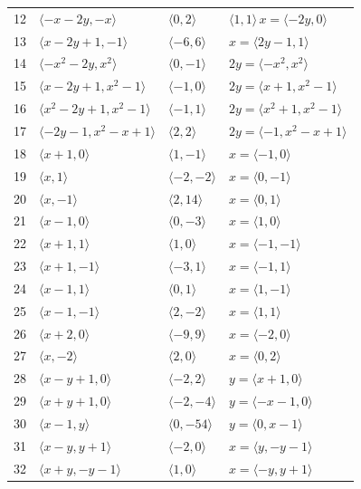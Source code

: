\documentclass[11pt]{article}
\begin{document}
\begin{longtable}{@{}rlll@{}}
12 & $\langle -x-2y,-x\rangle$ & $\langle 0,2\rangle$ & $\langle 1,1\rangle\,x=\langle -2y,0\rangle$\\
13 & $\langle x-2y+1,-1\rangle$ & $\langle -6,6\rangle$ & $x=\langle 2y-1,1\rangle$\\
14 & $\langle -x^{2}-2y,x^{2}\rangle$ & $\langle 0,-1\rangle$ & $2y=\langle -x^{2},x^{2}\rangle$\\
15 & $\langle x-2y+1,x^{2}-1\rangle$ & $\langle -1,0\rangle$ & $2y=\langle x+1,x^{2}-1\rangle$\\
16 & $\langle x^{2}-2y+1,x^{2}-1\rangle$ & $\langle -1,1\rangle$ & $2y=\langle x^{2}+1,x^{2}-1\rangle$\\
17 & $\langle -2y-1,x^{2}-x+1\rangle$ & $\langle 2,2\rangle$ & $2y=\langle -1,x^{2}-x+1\rangle$\\
18 & $\langle x+1,0\rangle$ & $\langle 1,-1\rangle$ & $x=\langle -1,0\rangle$\\
19 & $\langle x,1\rangle$ & $\langle -2,-2\rangle$ & $x=\langle 0,-1\rangle$\\
20 & $\langle x,-1\rangle$ & $\langle 2,14\rangle$ & $x=\langle 0,1\rangle$\\
21 & $\langle x-1,0\rangle$ & $\langle 0,-3\rangle$ & $x=\langle 1,0\rangle$\\
22 & $\langle x+1,1\rangle$ & $\langle 1,0\rangle$ & $x=\langle -1,-1\rangle$\\
23 & $\langle x+1,-1\rangle$ & $\langle -3,1\rangle$ & $x=\langle -1,1\rangle$\\
24 & $\langle x-1,1\rangle$ & $\langle 0,1\rangle$ & $x=\langle 1,-1\rangle$\\
25 & $\langle x-1,-1\rangle$ & $\langle 2,-2\rangle$ & $x=\langle 1,1\rangle$\\
26 & $\langle x+2,0\rangle$ & $\langle -9,9\rangle$ & $x=\langle -2,0\rangle$\\
27 & $\langle x,-2\rangle$ & $\langle 2,0\rangle$ & $x=\langle 0,2\rangle$\\
28 & $\langle x-y+1,0\rangle$ & $\langle -2,2\rangle$ & $y=\langle x+1,0\rangle$\\
29 & $\langle x+y+1,0\rangle$ & $\langle -2,-4\rangle$ & $y=\langle -x-1,0\rangle$\\
30 & $\langle x-1,y\rangle$ & $\langle 0,-54\rangle$ & $y=\langle 0,x-1\rangle$\\
31 & $\langle x-y,y+1\rangle$ & $\langle -2,0\rangle$ & $x=\langle y,-y-1\rangle$\\
32 & $\langle x+y,-y-1\rangle$ & $\langle 1,0\rangle$ & $x=\langle -y,y+1\rangle$\\

\end{longtable}
\end{document}
